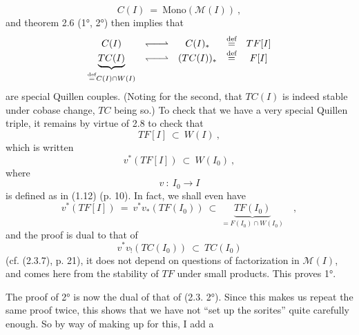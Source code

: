\documentclass[11pt]{article}
\newcommand{\msp}[1]{\marginpar{\footnotesize [#1]}}
\newcommand{\deq}{\overset{\text{def}}{=}}
\newcommand{\Mono}{\mathrm{Mono}}
\newcommand{\qpair}{\mathrel{\leftharpoondown\joinrel\relbar\joinrel\rightharpoonup}}
\begin{document}
\[ C(I) \ = \ \Mono(\mathcal{M}(I))\ , \]
and theorem 2.6 (1°, 2°) then implies that
\[ \begin{array}{ccccc}
C(I) & \qpair & C(I)_* & \deq & TF[I]\\
\underbrace{TC(I)}_{\deq C(I)\cap W(I)} & \qpair & (TC(I))_* & \deq & F[I]
\end{array} \] %
are special Quillen couples. (Noting for the second, that $TC(I)$ is indeed \msp{page 30} stable under cobase change, $TC$ being so.) To check that we have a very special Quillen triple, it remains by virtue of 2.8 to check that
\[ TF[I] \ \subset\ W(I)\ , \]
which is written
\[ v^*(TF[I]) \ \subset\ W(I_0)\ , \]
where
\[ v \ :\ I_0 \longrightarrow I \]
is defined as in (1.12) (p. 10). In fact, we shall even have
\[ v^*(TF[I]) \ = \ v^*v_*(TF(I_0)) \ \subset\ \underbrace{TF(I_0)}_{= F(I_0)\cap W(I_0)}\quad , \]
and the proof is dual to that of
\[ v^*v_!(TC(I_0)) \ \subset\ TC(I_0) \]
(cf. (2.3.7), p. 21), it does not depend on questions of factorization in $\mathcal{M}(I)$, and comes here from the stability of $TF$ under small products. This proves 1°.

The proof of 2° is now the dual of that of (2.3. 2°). Since this makes us repeat the same proof twice, this shows that we have not ``set up the sorites'' quite carefully enough. So by way of making up for this, I add a
\end{document}
